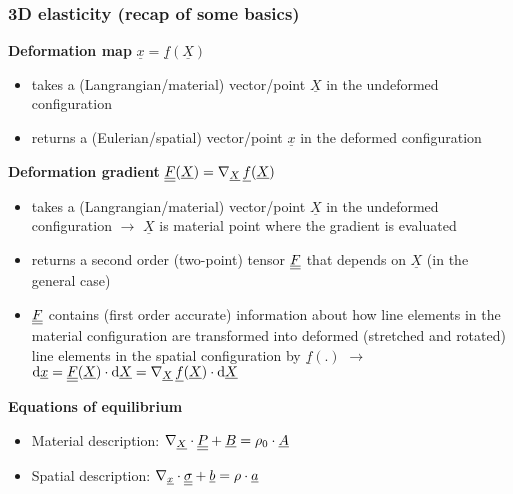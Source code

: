 \begin{frame}
  \frametitle{3D elasticity (recap of some basics)}
  
  \textbf{Deformation map} $\underline{x} = \underline{f}(\underline{X})$
  \begin{itemize}
    \item takes a (Langrangian/material) vector/point $\underline{X}$ in the undeformed configuration
    \item returns a (Eulerian/spatial) vector/point $\underline{x}$ in the deformed configuration
  \end{itemize}
  \vspace{1em}
  
  \textbf{Deformation gradient} $\underline{\underline{F}}(\underline{X}) = \nabla_{\underline{X}} \,\underline{f}(\underline{X})$
  \begin{itemize}
    \item takes a (Langrangian/material) vector/point $\underline{X}$ in the undeformed configuration \newline
      $\rightarrow$ $\underline{X}$ is material point where the gradient is evaluated
    \item returns a second order (two-point) tensor $\underline{\underline{F}}$ that depends on $\underline{X}$ (in the general case)
    \item $\underline{\underline{F}}$ contains (first order accurate) information about how line elements in the material configuration are transformed into deformed (stretched and rotated) line elements in the spatial configuration by $\underline{f}(.)$ \newline
      $\rightarrow$ $\dif \underline{x} = \doubleunderline{F}(\underline{X}) \cdot \dif \underline{X}= \nabla_{\underline{X}} \,\underline{f}(\underline{X}) \cdot \dif \underline{X}$
  \end{itemize}
  \vspace{1em}
  
  \textbf{Equations of equilibrium}
  \begin{itemize}
    \item Material description: $\nabla_{\underline{X}} \cdot \underline{\underline{P}} + \underline{B} = \rho_0 \cdot \underline{A}$
    \item Spatial description: $\nabla_{\underline{x}} \cdot \underline{\underline{\sigma}} + \underline{b} = \rho \cdot \underline{a}$
  \end{itemize}

\end{frame}


